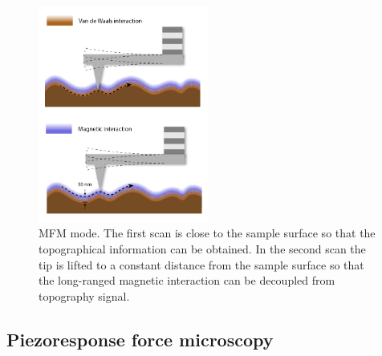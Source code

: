 \documentclass[pdflatex, sectionletters, 12pt]{pittetd}    %
\begin{document}
\begin{figure}[h!]
	\centering
	\includegraphics[width=0.5\textwidth]{Drawing/MFM.pdf}
	\caption{MFM mode. The first scan is close to the sample surface so that the topographical information can be obtained. In the second scan the tip is lifted to a constant distance from the sample surface so that the long-ranged magnetic interaction can be decoupled from topography signal.}
	\label{FIG:MFM}
\end{figure}

\subsection{Piezoresponse force microscopy}
\end{document}

